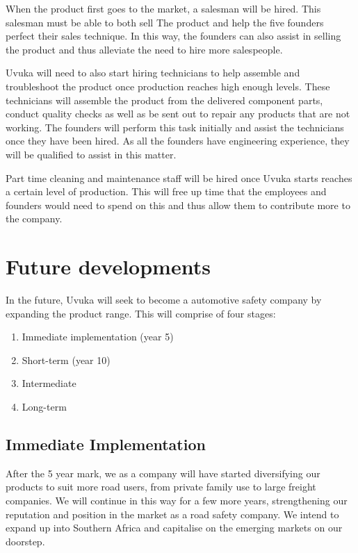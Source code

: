 When the product first goes to the market, a salesman will be hired. This salesman must be able to both sell The product and help the five founders perfect their sales technique. In this way, the founders can also assist in selling the product and thus alleviate the need to hire more salespeople.

Uvuka will need to also start hiring technicians to help assemble and troubleshoot the product once production reaches high enough levels. These technicians will assemble the product from the delivered component parts, conduct quality checks as well as be sent out to repair any products that are not working. The founders will perform this task initially and assist the technicians once they have been hired. As all the founders have engineering experience, they will be qualified to assist in this matter.

Part time cleaning and maintenance staff will be hired once Uvuka starts reaches a certain level of production. This will free up time that the employees and founders would need to spend on this and thus allow them to contribute more to the company.

\section{Future developments}
In the future, Uvuka will seek to become a automotive safety company by expanding the product range. This will comprise of four stages:
\begin{enumerate}
\item Immediate implementation (year 5)
\item Short-term (year 10)
\item Intermediate
\item Long-term
\end{enumerate}

\subsection{Immediate Implementation}
After the 5 year mark, we as a company will have started diversifying our products to suit more road users, from private family use to large freight companies. We will continue in this way for a few more years, strengthening our reputation and position in the market as a road safety company. We intend to expand up into Southern Africa and capitalise on the emerging markets on our doorstep.

